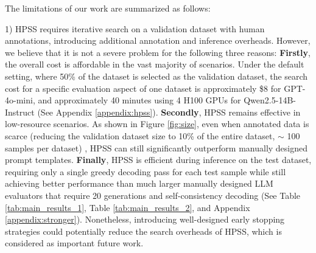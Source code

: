 The limitations of our work are summarized as follows:



1) HPSS requires iterative search on a validation dataset with human annotations, introducing additional annotation and inference overheads. However, we believe that it is not a severe problem for the following three reasons:
\textbf{Firstly}, the overall cost is affordable in the vast majority of scenarios. Under the default setting, where 50\% of the dataset is selected as the validation dataset, the search cost for a specific evaluation aspect of one dataset is approximately \$8 for GPT-4o-mini, and approximately 40 minutes using 4 H100 GPUs for Qwen2.5-14B-Instruct (See Appendix \ref{appendix:hpss}).
\textbf{Secondly}, HPSS remains effective in low-resource scenarios. As shown in Figure \ref{fig:size}, even when annotated data is scarce 
(reducing the validation dataset size to 10\% of the entire dataset, $ \sim $ 100 samples per dataset)
, HPSS can still significantly outperform manually designed prompt templates.
\textbf{Finally}, HPSS is efficient during inference on the test dataset, requiring only a single greedy decoding pass for each test sample while still achieving better performance than much larger manually designed LLM evaluators that require 20 generations and self-consistency decoding (See Table \ref{tab:main_results_1}, Table \ref{tab:main_results_2}, and Appendix \ref{appendix:stronger}).
Nonetheless, introducing well-designed early stopping strategies
could potentially reduce the search overheads of HPSS, which is considered as important future work.

